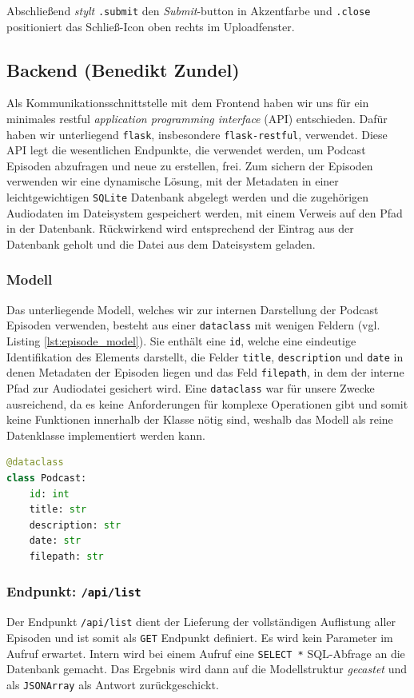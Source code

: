 \documentclass{article}
\begin{document}
Abschließend \textit{stylt} \texttt{.submit} den \textit{Submit}-button in Akzentfarbe und \texttt{.close} positioniert das Schließ-Icon oben rechts im Uploadfenster.



\subsection{Backend \small{(Benedikt Zundel)}}
Als Kommunikationsschnittstelle mit dem Frontend haben wir uns für ein minimales restful \textit{application programming interface} (API) entschieden. Dafür haben wir unterliegend \texttt{flask}, insbesondere \texttt{flask-restful}, verwendet. Diese API legt die wesentlichen Endpunkte, die verwendet werden, um Podcast Episoden abzufragen und neue zu erstellen, frei. Zum sichern der Episoden verwenden wir eine dynamische Lösung, mit der Metadaten in einer leichtgewichtigen \texttt{SQLite} Datenbank abgelegt werden und die zugehörigen Audiodaten im Dateisystem gespeichert werden, mit einem Verweis auf den Pfad in der Datenbank. Rückwirkend wird entsprechend der Eintrag aus der Datenbank geholt und die Datei aus dem Dateisystem geladen.

\subsubsection{Modell}
Das unterliegende Modell, welches wir zur internen Darstellung der Podcast Episoden verwenden, besteht aus einer \texttt{dataclass} mit wenigen Feldern (vgl. Listing \ref{lst:episode_model}). Sie enthält eine \texttt{id}, welche eine eindeutige Identifikation des Elements darstellt, die Felder \texttt{title}, \texttt{description} und \texttt{date} in denen Metadaten der Episoden liegen und das Feld \texttt{filepath}, in dem der interne Pfad zur Audiodatei gesichert wird. Eine \texttt{dataclass} war für unsere Zwecke ausreichend, da es keine Anforderungen für komplexe Operationen gibt und somit keine Funktionen innerhalb der Klasse nötig sind, weshalb das Modell als reine Datenklasse implementiert werden kann.

\begin{lstlisting}[label=lst:episode_model, language=Python, caption=Implementation der Podcast-Episoden Klasse]
@dataclass
class Podcast:
    id: int
    title: str
    description: str
    date: str
    filepath: str
\end{lstlisting}

\subsubsection{Endpunkt: \texttt{/api/list}}
Der Endpunkt \texttt{/api/list} dient der Lieferung der vollständigen Auflistung aller Episoden und ist somit als \texttt{GET} Endpunkt definiert. Es wird kein Parameter im Aufruf erwartet. Intern wird bei einem Aufruf eine \texttt{SELECT *} SQL-Abfrage an die Datenbank gemacht. Das Ergebnis wird dann auf die Modellstruktur \textit{gecastet} und als \texttt{JSONArray} als Antwort zurückgeschickt.
\end{document}
